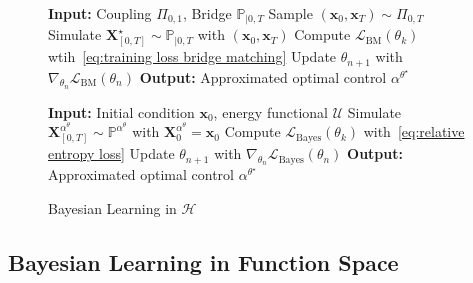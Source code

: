 \documentclass[nohyperref]{article}
\theoremstyle{plain}
\theoremstyle{remark}
\newcommand{\mc}{\mathcal}
\newcommand{\mb}{\mathbf}
\begin{document}
\begin{figure}[!t]
\begin{minipage}[t]{0.47\textwidth}
  \begin{algorithm}[H]
    \caption{Bridge Matching of DBHS}
    \begin{algorithmic}\label{algorithm:BM}
    \STATE \textbf{Input:} Coupling $\Pi_{0, 1}$, Bridge $\mathbb{P}_{|0, T}$
        \STATE Sample $(\mb{x}_0, \mb{x}_T) \sim \Pi_{0, T}$
        \STATE Simulate $\mb{X}_{[0,T]}^{\star} \sim \mathbb{P}_{|0,T}$ with $(\mb{x}_0, \mb{x}_T)$
        \STATE Compute $\mc{L}_{\text{BM}}(\theta_k)$ wtih~\eqref{eq:training loss bridge matching}
        \STATE Update $\theta_{n+1}$ with $\nabla_{\theta_n} \mc{L}_{\text{BM}}(\theta_n)$
      \ENDFOR
    \STATE \textbf{Output:} Approximated optimal control $\alpha^{\theta^{\star}}$
    \end{algorithmic}
  \end{algorithm}
\end{minipage}
\begin{minipage}[t]{0.51\textwidth}
  \begin{algorithm}[H]
    \caption{Bayesian Learning in $\mc{H}$}
    \begin{algorithmic}\label{algorithm:exact sampling}
    \STATE \textbf{Input:} 
    Initial condition $\mb{x}_0$, energy functional $\mc{U}$
        \STATE Simulate $\mb{X}^{\alpha^{\theta}}_{[0, T]} \sim \mathbb{P}^{\alpha^{\theta}}$ with $\mb{X}^{\alpha^{\theta}}_0 = \mb{x}_0$
        \STATE Compute $\mc{L}_{\text{Bayes}}(\theta_k)$ with~\eqref{eq:relative entropy loss}
        \STATE Update $\theta_{n+1}$ with $\nabla_{\theta_n} \mc{L}_{\text{Bayes}}(\theta_n)$
      \ENDFOR
    \STATE \textbf{Output:} Approximated optimal control $\alpha^{\theta^{\star}}$
    \end{algorithmic}
  \end{algorithm}
\end{minipage}
\vspace{-5mm}
\end{figure}
\subsection{Bayesian Learning in Function Space}
\end{document}
